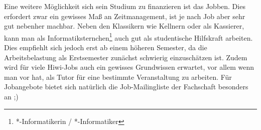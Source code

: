 Eine weitere Möglichkeit sich sein Studium zu finanzieren ist das Jobben. Dies erfordert zwar ein gewisses Maß an Zeitmanagement, ist je nach Job aber sehr gut nebenher machbar. Neben den Klassikern wie Kellnern oder als Kassierer, kann man als Informatik\-stern\-chen\footnote{*-Informatikerin / *-Informatiker} auch gut als studentische Hilfskraft arbeiten. Dies empfiehlt sich jedoch erst ab einem höheren Semester, da die Arbeitsbelastung als Erstsemester zunächst schwierig einzuschätzen ist. Zudem wird für viele Hiwi-Jobs auch ein gewisses Grundwissen erwartet, vor allem wenn man vor hat, als Tutor für eine bestimmte Veranstaltung zu arbeiten. Für Jobangebote bietet sich natürlich die Job-Mailingliste der Fachschaft besonders an ;)